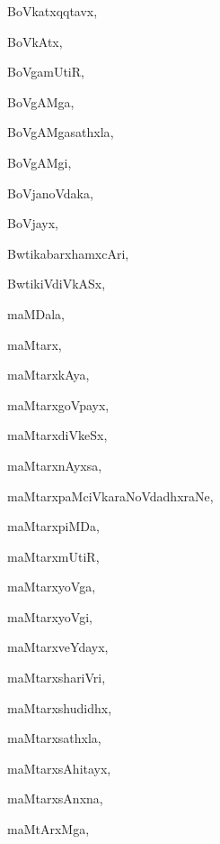 \begin{multicols}{3}
{\noindent
{BoVkatxqqtavx}, \pageref{BoVkatxqqtavx}

\noindent
{BoVkAtx}, \pageref{BoVkAtx}

\noindent
{BoVgamUtiR}, \pageref{BoVgamUtiR}

\noindent
{BoVgAMga}, \pageref{BoVgAMga}

\noindent
{BoVgAMgasathxla}, \pageref{BoVgAMgasathxla}

\noindent
{BoVgAMgi}, \pageref{BoVgAMgi}

\noindent
{BoVjanoVdaka}, \pageref{BoVjanoVdaka}

\noindent
{BoVjayx}, \pageref{BoVjayx}

\noindent
{BwtikabarxhamxcAri}, \pageref{BwtikabarxhamxcAri}

\noindent
{BwtikiVdiVkASx}, \pageref{BwtikiVdiVkASx}

\bigskip
\noindent
{}
\smallskip

\noindent
{maMDala}, \pageref{maMDala}

\noindent
{maMtarx}, \pageref{maMtarx}

\noindent
{maMtarxkAya}, \pageref{maMtarxkAya}

\noindent
{maMtarxgoVpayx}, \pageref{maMtarxgoVpayx}

\noindent
{maMtarxdiVkeSx}, \pageref{maMtarxdiVkeSx}

\noindent
{maMtarxnAyxsa}, \pageref{maMtarxnAyxsa}

\noindent
{maMtarxpaMciVkaraNoVdadhxraNe}, \pageref{maMtarxpaMciVkaraNoVdadhxraNe}

\noindent
{maMtarxpiMDa}, \pageref{maMtarxpiMDa}

\noindent
{maMtarxmUtiR}, \pageref{maMtarxmUtiR}

\noindent
{maMtarxyoVga}, \pageref{maMtarxyoVga}

\noindent
{maMtarxyoVgi}, \pageref{maMtarxyoVgi}

\noindent
{maMtarxveYdayx}, \pageref{maMtarxveYdayx}

\noindent
{maMtarxshariVri}, \pageref{maMtarxshariVri}

\noindent
{maMtarxshudidhx}, \pageref{maMtarxshudidhx}

\noindent
{maMtarxsathxla}, \pageref{maMtarxsathxla}

\noindent
{maMtarxsAhitayx}, \pageref{maMtarxsAhitayx}

\noindent
{maMtarxsAnxna}, \pageref{maMtarxsAnxna}

\noindent
{maMtArxMga}, \pageref{maMtArxMga}

}
\end{multicols}
